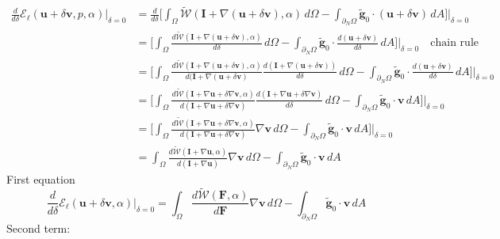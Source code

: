 \documentclass[12pt,3p]{article}
\numberwithin{equation}{section}
\begin{document}
\begin{align*}
\frac{d}{d \delta} \mathcal{E}_\ell (\bm{u} + \delta \bm{v}, p,  \alpha) \big\rvert_{\delta = 0} 
	&= \frac{d}{d \delta} \bigg[ \int_\Omega  \widetilde{\mathcal{W}}(\mathbf{I} + \nabla (\bm{u} + \delta \bm{v}),\alpha)\,  d\Omega - \int_{\partial_N\Omega} {\tilde{\bm{g}}}_0 \cdot (\bm{u} + \delta \bm{v}) \, dA \bigg] \bigg\rvert_{\delta = 0} \\
	&= \bigg[ \int_\Omega \frac{d \widetilde{\mathcal{W}}(\mathbf{I} + \nabla (\bm{u} + \delta \bm{v}),\alpha)}{d \delta} \, d\Omega -  \int_{\partial_N\Omega} {\tilde{\bm{g}}}_0 \cdot \frac{d(\bm{u} + \delta \bm{v})}{d \delta} \, dA \bigg] \bigg\rvert_{\delta = 0} \quad \text{chain rule} \\
	&= \bigg[ \int_\Omega \frac{d \widetilde{\mathcal{W}}(\mathbf{I} + \nabla (\bm{u} + \delta \bm{v}),\alpha)}{d (\mathbf{I} + \nabla (\bm{u} + \delta \bm{v})} \frac{d (\mathbf{I} + \nabla (\bm{u} + \delta \bm{v}))}{d \delta} \, d\Omega -  \int_{\partial_N\Omega} {\tilde{\bm{g}}}_0 \cdot \frac{d(\bm{u} + \delta \bm{v})}{d \delta} \, dA \bigg] \bigg\rvert_{\delta = 0}\\
	&= \bigg[ \int_\Omega \frac{d \widetilde{\mathcal{W}}(\mathbf{I} + \nabla \bm{u} + \delta \nabla \bm{v}, \alpha)}{d (\mathbf{I} + \nabla \bm{u} + \delta \nabla \bm{v})} \frac{d (\mathbf{I} + \nabla \bm{u} + \delta \nabla \bm{v})}{d \delta} \, d\Omega -  \int_{\partial_N\Omega} {\tilde{\bm{g}}}_0 \cdot \bm{v} \, dA \bigg] \bigg\rvert_{\delta = 0}\\
	&= \bigg[ \int_\Omega \frac{d \widetilde{\mathcal{W}}(\mathbf{I} + \nabla \bm{u} + \delta \nabla \bm{v}, \alpha)}{d (\mathbf{I} + \nabla \bm{u} + \delta \nabla \bm{v})} \nabla \bm{v} \, d\Omega -  \int_{\partial_N\Omega} {\tilde{\bm{g}}}_0 \cdot \bm{v} \, dA \bigg] \bigg\rvert_{\delta = 0} \\
	&= \int_\Omega \frac{d \widetilde{\mathcal{W}}(\mathbf{I} + \nabla \bm{u}, \alpha)}{d (\mathbf{I} + \nabla \bm{u})} \nabla \bm{v} \, d\Omega -  \int_{\partial_N\Omega} {\tilde{\bm{g}}}_0 \cdot \bm{v} \, dA 
\end{align*}
First equation
\begin{equation}\label{Eq:WeakForm1}
\frac{d}{d \delta} \mathcal{E}_\ell (\bm{u} + \delta \bm{v}, \alpha) \big\rvert_{\delta = 0} 
	= \int_\Omega \frac{d \widetilde{\mathcal{W}}(\mathbf{F}, \alpha)}{d \mathbf{F}} \nabla \bm{v} \, d\Omega -  \int_{\partial_N\Omega} {\tilde{\bm{g}}}_0 \cdot \bm{v} \, dA 
\end{equation}
Second term: 
\end{document}
